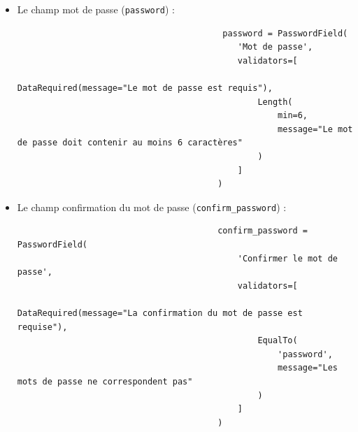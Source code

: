 \documentclass[a4paper,11pt]{article}
\begin{document}
\begin{enumerate}
\begin{itemize}
\begin{tcolorbox}[colback=lightgray!6, colframe=black, left=-70mm, right=5mm, top=2mm, bottom=0mm, boxrule=0.1mm]
                                \end{tcolorbox}
                            \item Le champ mot de passe (\texttt{password}) :
                                \begin{tcolorbox}[colback=lightgray!6, colframe=black, left=-75mm, right=5mm, top=2mm, bottom=0mm, boxrule=0.1mm]
                                    \begin{verbatim}
                                         password = PasswordField(
                                            'Mot de passe', 
                                            validators=[
                                                DataRequired(message="Le mot de passe est requis"),
                                                Length(
                                                    min=6, 
                                                    message="Le mot de passe doit contenir au moins 6 caractères"
                                                )
                                            ]
                                        )
                                    \end{verbatim}
                                \end{tcolorbox}
                            \item Le champ confirmation du mot de passe (\texttt{confirm\_password}) :
                                \begin{tcolorbox}[colback=lightgray!6, colframe=black, left=-75mm, right=5mm, top=2mm, bottom=0mm, boxrule=0.1mm]
                                    \begin{verbatim}
                                        confirm_password = PasswordField(
                                            'Confirmer le mot de passe', 
                                            validators=[
                                                DataRequired(message="La confirmation du mot de passe est requise"),
                                                EqualTo(
                                                    'password', 
                                                    message="Les mots de passe ne correspondent pas"
                                                )
                                            ]
                                        )
                                    \end{verbatim}
                                \end{tcolorbox}
                        \end{itemize}


\end{enumerate}
\end{document}
